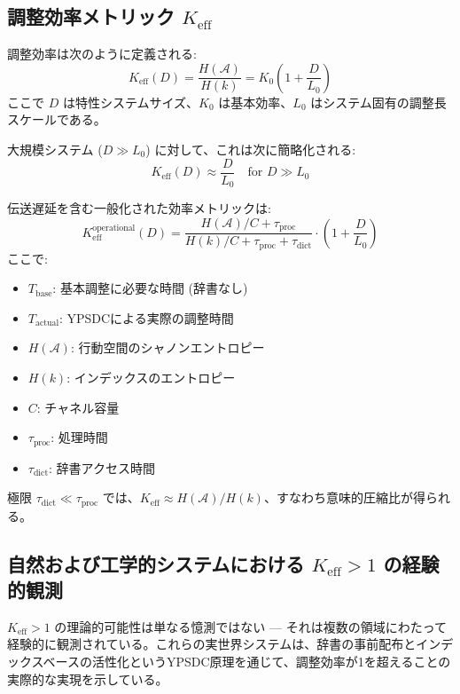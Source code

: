 \documentclass[11pt,a4paper]{article}
\begin{document}
	\subsection{調整効率メトリック \texorpdfstring{$K_{\mathrm{eff}}$}{K_eff}}
	調整効率は次のように定義される:
	\begin{equation}
		K_{\mathrm{eff}}(D) = \frac{H(\mathcal{A})}{H(k)} = K_0 \left(1 + \frac{D}{L_0}\right)
	\end{equation}
	ここで $D$ は特性システムサイズ、$K_0$ は基本効率、$L_0$ はシステム固有の調整長スケールである。
	
	大規模システム ($D \gg L_0$) に対して、これは次に簡略化される:
	\begin{equation}
		K_{\mathrm{eff}}(D) \approx \frac{D}{L_0} \quad \text{for } D \gg L_0
	\end{equation}
	
	伝送遅延を含む一般化された効率メトリックは:
	\begin{equation}
		K_{\mathrm{eff}}^{\text{operational}}(D) = \frac{H(\mathcal{A})/C + \tau_{\text{proc}}}{H(k)/C + \tau_{\text{proc}} + \tau_{\text{dict}}} \cdot \left(1 + \frac{D}{L_0}\right)
	\end{equation}
	ここで:
	\begin{itemize}
		\item $T_{\text{base}}$: 基本調整に必要な時間 (辞書なし)
		\item $T_{\text{actual}}$: YPSDCによる実際の調整時間
		\item $H(\mathcal{A})$: 行動空間のシャノンエントロピー
		\item $H(k)$: インデックスのエントロピー
		\item $C$: チャネル容量
		\item $\tau_{\text{proc}}$: 処理時間
		\item $\tau_{\text{dict}}$: 辞書アクセス時間
	\end{itemize}
	
	極限 $\tau_{\text{dict}} \ll \tau_{\text{proc}}$ では、$K_{\mathrm{eff}} \approx H(\mathcal{A})/H(k)$、すなわち意味的圧縮比が得られる。
	
	\subsection{自然および工学的システムにおける $K_{\mathrm{eff}} > 1$ の経験的観測}
	\label{sec:empirical-keff}
	
	$K_{\mathrm{eff}} > 1$ の理論的可能性は単なる憶測ではない — それは複数の領域にわたって経験的に観測されている。これらの実世界システムは、辞書の事前配布とインデックスベースの活性化というYPSDC原理を通じて、調整効率が1を超えることの実際的な実現を示している。
	
\end{document}

